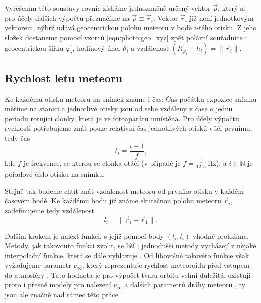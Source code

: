 Vyřešením této soustavy rovnic získáme jednoznačně určený vektor $\vec{\rho}$, který si pro účely dalších výpočtů přeznačíme na $\vec{\rho}\equiv\vec{r}_i$. Vektor $\vec{r}_i$ již není jednotkovým vektorem, nýbrž udává geocentrickou polohu meteoru v bodě $i$-tého otisku. Z jeho složek dostaneme pomocí vzorců \eqref{eqn:photo:geo_xyz} zpět polární souřadnice ; geocentrickou šířku $\varphi^\prime_i$, hodinový úhel $\vartheta_i$ a vzdálenost $(R_{\varphi_i}+h_i)=\lVert\vec{r}_i\rVert$.

\subsection{Rychlost letu meteoru}
Ke každému otisku meteoru na snímek známe i čas: Čas počátku expozice snímku měříme na stanici a jednotlivé otisky jsou od sebe vzdáleny v čase o jednu periodu rotující clonky, která je ve fotoaparátu umístěna. Pro účely výpočtu rychlosti potřebujeme znát pouze relativní čas jednotlivých otisků vůči prvnímu, tedy čas
\begin{equation}
    t_i=\frac{i-1}{f}\text{,}
\end{equation}
kde $f$ je frekvence, se kterou se clonka otáčí (v případě \cite{ceplecha} je $f=\frac{1}{12{,}5}\:\text{Hz}$), a $i\in\mathbb{N}$ je pořadové číslo otisku na snímku.

Stejně tak budeme chtít znát vzdálenost meteoru od prvního otisku v každém časovém bodě. Ke každému bodu již známe skutečnou polohu meteoru $\vec{r}_i$, zadefinujeme tedy vzdálenost
\begin{equation}
    l_i=\lVert\vec{r}_i-\vec{r}_1\rVert\text{.}
\end{equation}

\medskip

Dalším krokem je nalézt funkci, s jejíž pomocí body $\left(t_i,l_i\right)$ vhodně proložíme. Metody, jak takovouto funkci zvolit, se liší \cite{ceplecha}; jednodušší metody vycházejí z nějaké interpolační funkce, která se dále vyhlazuje \cite{ceplecha}. Od libovolné takovéto funkce však vyžadujeme parametr $v_\infty$, který reprezentuje rychlost meteoroidu před vstupem do atmosféry \cite{ceplecha}. Tato hodnota je pro výpočet tvaru orbitu velmi důležitá, existují proto i přesné modely pro nalezení $v_\infty$ a dalších parametrů dráhy meteoru \cite{ceplecha}\cite{singlebodymeteor}, ty jsou ale značně nad rámec této práce.

